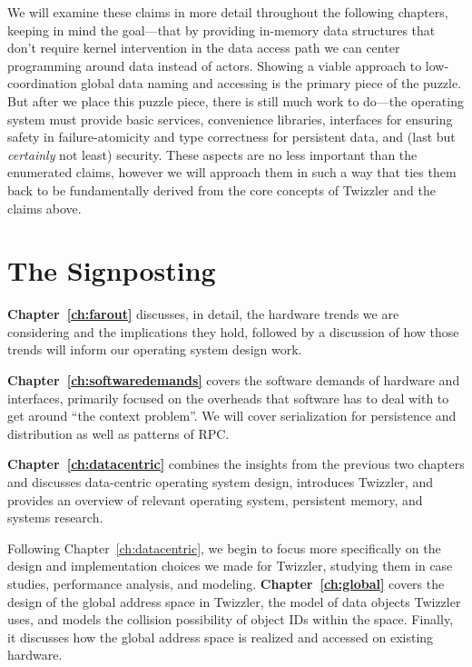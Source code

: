 We will examine these claims in more detail throughout the following chapters, keeping in mind the goal---that by
providing in-memory data structures that don't require kernel intervention in the data access path we can center
programming around data instead of actors. Showing a viable approach to low-coordination global data naming and
accessing is the primary piece of the puzzle. But after we place this puzzle piece, there is still much work to do---the
operating system must provide basic services, convenience libraries, interfaces for ensuring safety in
failure-atomicity and type correctness for persistent data, and (last but \emph{certainly} not least) security. These
aspects are no less important than the enumerated claims, however we will approach them in such a way that ties
them back to be fundamentally derived from the core concepts of Twizzler and the claims above.

\section*{The Signposting}

\noindent\textbf{Chapter~\ref{ch:farout}} discusses, in detail, the hardware trends we are considering and the implications they
hold, followed by a discussion of how those trends will inform our operating system design work.

\vspace{2em}

\noindent\textbf{Chapter~\ref{ch:softwaredemands}} covers the software demands of hardware and interfaces, primarily focused on
the overheads that software has to deal with to get around ``the context problem''. We will cover serialization for
persistence and distribution as well as patterns of RPC.

\vspace{2em}

\noindent\textbf{Chapter~\ref{ch:datacentric}} combines the insights from the previous two chapters and discusses data-centric
operating system design, introduces Twizzler, and provides an overview of relevant operating system, persistent memory,
and systems research.

\vspace{2em}

\noindent Following Chapter~\ref{ch:datacentric}, we begin to focus more specifically on the design and implementation choices we
made for Twizzler, studying them in case studies, performance analysis, and modeling.
\textbf{Chapter~\ref{ch:global}} covers the design of the global address space in Twizzler, the model of data objects
Twizzler uses, and models the collision possibility of object IDs within the space. Finally, it discusses how the global
address space is realized and accessed on existing hardware.

